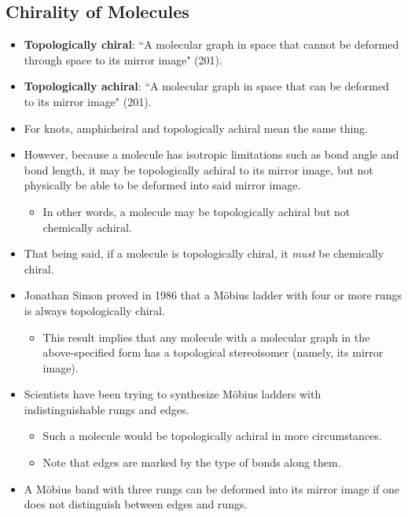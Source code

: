 \documentclass[titlepage]{article}
\numberwithin{figure}{section}
\numberwithin{table}{section}
\numberwithin{equation}{section}
\newcommand{\dq}[2]{``#1" (#2).}
\begin{document}
\subsection{Chirality of Molecules}
\begin{itemize}
    \item \textbf{Topologically chiral}: \dq{A molecular graph in space that cannot be deformed through space to its mirror image}{201}
    \item \textbf{Topologically achiral}: \dq{A molecular graph in space that can be deformed to its mirror image}{201}
    \item For knots, amphicheiral and topologically achiral mean the same thing.
    \item However, because a molecule has isotropic limitations such as bond angle and bond length, it may be topologically achiral to its mirror image, but not physically be able to be deformed into said mirror image.
    \begin{itemize}
        \item In other words, a molecule may be topologically achiral but not chemically achiral.
    \end{itemize}
    \item That being said, if a molecule is topologically chiral, it \emph{must} be chemically chiral.
    \item Jonathan Simon proved in 1986 that a M\"{o}bius ladder with four or more rungs is always topologically chiral.
    \begin{itemize}
        \item This result implies that any molecule with a molecular graph in the above-specified form has a topological stereoisomer (namely, its mirror image).
    \end{itemize}
    \item Scientists have been trying to synthesize M\"{o}bius ladders with indistinguishable rungs and edges.
    \begin{itemize}
        \item Such a molecule would be topologically achiral in more circumstances.
        \item Note that edges are marked by the type of bonds along them.
    \end{itemize}
    \item A M\"{o}bius band with three rungs can be deformed into its mirror image if one does not distinguish between edges and rungs.
    \begin{figure}[h!]
        \centering

\end{figure}
\end{itemize}
\end{document}
